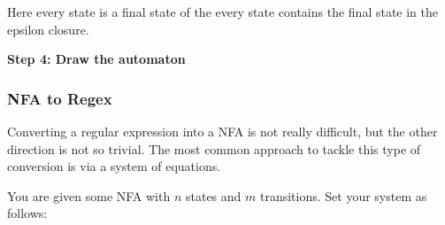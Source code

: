 Here every state is a final state of the every state contains the final state in the epsilon closure.

\textbf{Step 4: Draw the automaton}

\begin{center}
\end{center}

\subsubsection{NFA to Regex}

Converting a regular expression into a NFA is not really difficult, but the other direction is not 
so trivial. The most common approach to tackle this type of conversion is via a system of equations.

You are given some NFA with \(n\) states and \(m\) transitions. Set your system as follows:

